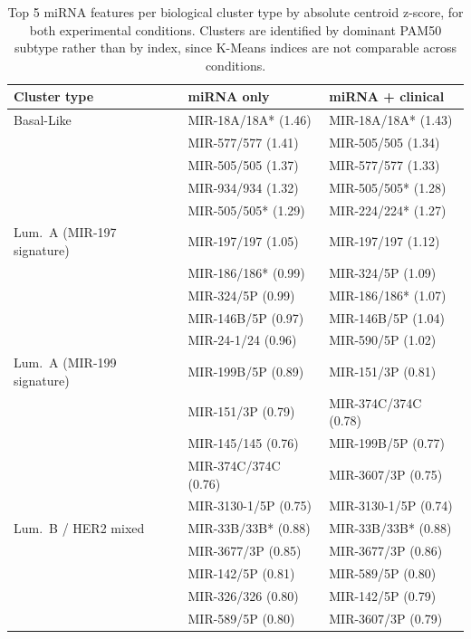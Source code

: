 \begin{table}[!ht]
    \centering
    \caption{Top 5 miRNA features per biological cluster type by absolute centroid z-score,
    for both experimental conditions. Clusters are identified by dominant PAM50 subtype
    rather than by index, since K-Means indices are not comparable across conditions.}
    \label{tab:top5_both}
    \begin{tabular}{lll}
    \hline
    \textbf{Cluster type} & \textbf{miRNA only} & \textbf{miRNA + clinical} \\
    \hline
    Basal-Like
    & MIR-18A/18A* (1.46) & MIR-18A/18A* (1.43) \\
    & MIR-577/577 (1.41)  & MIR-505/505 (1.34)  \\
    & MIR-505/505 (1.37)  & MIR-577/577 (1.33)  \\
    & MIR-934/934 (1.32)  & MIR-505/505* (1.28) \\
    & MIR-505/505* (1.29) & MIR-224/224* (1.27) \\
    \hline
    Lum.\ A (MIR-197 signature)
    & MIR-197/197 (1.05)  & MIR-197/197 (1.12)  \\
    & MIR-186/186* (0.99) & MIR-324/5P (1.09)   \\
    & MIR-324/5P (0.99)   & MIR-186/186* (1.07) \\
    & MIR-146B/5P (0.97)  & MIR-146B/5P (1.04)  \\
    & MIR-24-1/24 (0.96)  & MIR-590/5P (1.02)   \\
    \hline
    Lum.\ A (MIR-199 signature)
    & MIR-199B/5P (0.89)   & MIR-151/3P (0.81)    \\
    & MIR-151/3P (0.79)    & MIR-374C/374C (0.78) \\
    & MIR-145/145 (0.76)   & MIR-199B/5P (0.77)   \\
    & MIR-374C/374C (0.76) & MIR-3607/3P (0.75)   \\
    & MIR-3130-1/5P (0.75) & MIR-3130-1/5P (0.74) \\
    \hline
    Lum.\ B / HER2 mixed
    & MIR-33B/33B* (0.88) & MIR-33B/33B* (0.88) \\
    & MIR-3677/3P (0.85)  & MIR-3677/3P (0.86)  \\
    & MIR-142/5P (0.81)   & MIR-589/5P (0.80)   \\
    & MIR-326/326 (0.80)  & MIR-142/5P (0.79)   \\
    & MIR-589/5P (0.80)   & MIR-3607/3P (0.79)  \\
    \hline
    \end{tabular}
\end{table}

